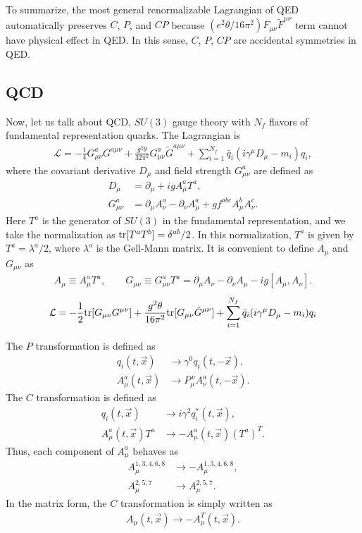 \documentclass[11pt,a4paper]{article}
\begin{document}
To summarize, the most general renormalizable Lagrangian of QED automatically preserves $C$, $P$, and $CP$ because $(e^2 \theta/16\pi^2) F_{\mu\nu}\tilde F^{\mu\nu}$ term cannot have physical effect in QED.
In this sense, $C$, $P$, $CP$ are accidental symmetries in QED.


\subsection{QCD}
Now, let us talk about QCD, $SU(3)$ gauge theory with $N_f$ flavors of fundamental representation quarks. The Lagrangian is
\begin{align}
    \mathcal{L} = -\frac{1}{4} G_{\mu\nu}^a G^{a\mu\nu} + \frac{g^2 \theta}{32\pi^2} G_{\mu\nu}^a \tilde G^{a\mu\nu}
    + \sum_{i=1}^{N_f} \bar q_i (i\gamma^\mu D_\mu - m_i) q_i, \label{eq:lagrangian QCD}
\end{align}
where the covariant derivative $D_\mu$ and field strength $G_{\mu\nu}^a$ are defined as
\begin{align}
    D_\mu &= \partial_\mu + i g A_\mu^a T^a, \\
    G_{\mu\nu}^a &= \partial_\mu A_\nu^a - \partial_\nu A_\mu^a + g f^{abc} A_\mu^b A_\nu^c.
\end{align}
Here $T^a$ is the generator of $SU(3)$ in the fundamental representation, and we take the normalization as ${\rm tr}[T^a T^b] = \delta^{ab}/2$. In this normalization, $T^a$ is given by $T^a = \lambda^a/2$, where $\lambda^a$ is the Gell-Mann matrix. 
It is convenient to define $A_\mu$ and $G_{\mu\nu}$ as
\begin{align}
    A_\mu \equiv A_\mu^a T^a, \qquad
    G_{\mu\nu} \equiv G_{\mu\nu}^a T^a = \partial_\mu A_\nu - \partial_\nu A_\mu -i g [A_\mu, A_\nu].
\end{align}
\begin{align}
    \mathcal{L} = -\frac{1}{2} {\rm tr}[G_{\mu\nu} G^{\mu\nu}] + \frac{g^2 \theta}{16\pi^2} {\rm tr}[G_{\mu\nu} \tilde G^{\mu\nu}]
    + \sum_{i=1}^{N_f} \bar q_i (i\gamma^\mu D_\mu - m_i) q_i
\end{align}

The $P$ transformation is defined as
\begin{align}
    q_i(t,\vec x) &\to \gamma^0 q_i(t,-\vec x), \\
    A_\mu^a(t,\vec x) &\to P_{\mu}^{\,\nu} A_\nu^a(t, -\vec x).
\end{align}
%
The $C$ transformation is defined as
\begin{align}
    q_i(t,\vec x) &\to i \gamma^2 q_i^*(t, \vec x), \\
    A_\mu^a(t,\vec x) T^a &\to -A_\mu^a(t, \vec x) (T^a)^T.
\end{align}
Thus, each component of $A_\mu^a$ behaves as
\begin{align}
    A_\mu^{1,3,4,6,8} &\to -A_\mu^{1,3,4,6,8}, \\
    A_\mu^{2,5,7} &\to A_\mu^{2,5,7}.
\end{align}
In the matrix form, the $C$ transformation is simply written as
\begin{align}
    A_\mu(t,\vec x) \to -A_\mu^T(t, \vec x).
\end{align}
\end{document}
